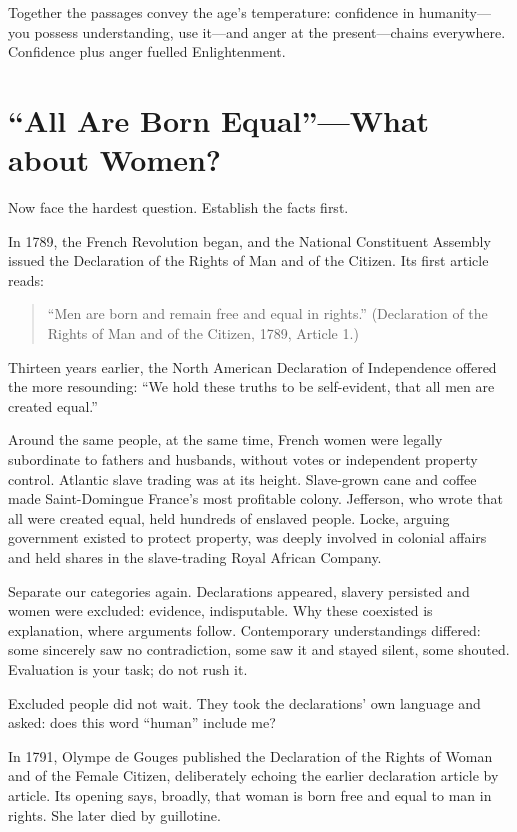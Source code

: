 Together the passages convey the age's temperature: confidence in humanity---you possess understanding, use it---and anger at the present---chains everywhere. Confidence plus anger fuelled Enlightenment.

\section{``All Are Born Equal''---What about Women?}
Now face the hardest question. Establish the facts first.

In 1789, the French Revolution began, and the National Constituent Assembly issued the Declaration of the Rights of Man and of the Citizen. Its first article reads:

\begin{quote}
``Men are born and remain free and equal in rights.'' (Declaration of the Rights of Man and of the Citizen, 1789, Article 1.)
\end{quote}
Thirteen years earlier, the North American Declaration of Independence offered the more resounding: ``We hold these truths to be self-evident, that all men are created equal.''

Around the same people, at the same time, French women were legally subordinate to fathers and husbands, without votes or independent property control. Atlantic slave trading was at its height. Slave-grown cane and coffee made Saint-Domingue France's most profitable colony. Jefferson, who wrote that all were created equal, held hundreds of enslaved people. Locke, arguing government existed to protect property, was deeply involved in colonial affairs and held shares in the slave-trading Royal African Company.

Separate our categories again. Declarations appeared, slavery persisted and women were excluded: evidence, indisputable. Why these coexisted is explanation, where arguments follow. Contemporary understandings differed: some sincerely saw no contradiction, some saw it and stayed silent, some shouted. Evaluation is your task; do not rush it.

Excluded people did not wait. They took the declarations' own language and asked: does this word ``human'' include me?

In 1791, Olympe de Gouges published the Declaration of the Rights of Woman and of the Female Citizen, deliberately echoing the earlier declaration article by article. Its opening says, broadly, that woman is born free and equal to man in rights. She later died by guillotine.

